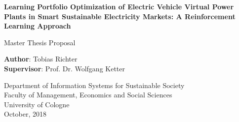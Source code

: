 \begin{titlepage}
    \begin{center}
        \vspace*{1cm}

        \Large
        \textbf{Learning Portfolio Optimization of Electric Vehicle Virtual Power Plants in Smart Sustainable Electricity Markets: A Reinforcement Learning Approach}

        \vspace{1.5cm}
        Master Thesis Proposal

        \vspace{7.0cm}

        \small
        \textbf{Author}: Tobias Richter\\
        \small
        \textbf{Supervisor}: Prof. Dr. Wolfgang Ketter

        \vspace{1cm}
        \small
        Department of Information Systems for Sustainable Society\\
        Faculty of Management, Economics and Social Sciences\\
        University of Cologne\\

        \vspace{1cm}
        October, 2018

    \end{center}
\end{titlepage}
